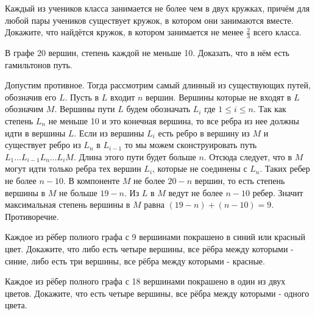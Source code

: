 \documentclass[11pt, a4paper]{common/document_template}
\begin{document}
\begin{exercise} 
Каждый из учеников класса занимается не более чем в двух кружках, причём для любой пары учеников существует кружок, в котором они занимаются вместе. Докажите, что найдётся кружок, в котором занимается не менее $\frac{2}{3}$ всего класса.
\end{exercise}

\begin{Solution}

\end{Solution}

\begin{exercise}
В графе 20 вершин, степень каждой не меньше 10. Доказать, что в нём есть гамильтонов путь.
\end{exercise}

\begin{Solution}
Допустим противное. Тогда рассмотрим самый длинный из существующих путей, обозначив его $L$. Пусть в $L$ входит $n$ вершин. Вершины которые не входят в $L$ обозначим $M$. Вершины пути $L$ будем обозначать $L_{i}$ где $1 \leqslant i \leqslant n$. Так как степень $L_{n}$ не меньше 10 и это конечная вершина, то все ребра из нее должны идти в вершины $L$. Если из вершины $L_{i}$ есть ребро в вершину из $M$ и существует ребро из $L_{n}$ в $L_{i - 1}$ то мы можем сконструировать путь $L_{1} \dots L_{i-1}L_{n}\dots L_{i} M$. Длина этого пути будет больше $n$. Отсюда следует, что в $M$ могут идти только ребра тех вершин $L_{i}$, которые не соединены с $L_{n}$. Таких ребер не более $n - 10$. В компоненте $M$ не более $20 - n$ вершин, то есть степень вершины в $M$ не больше $19 - n$. Из $L$ в $M$ ведут не более $n - 10$ ребер. Значит максимальная степень вершины в $M$ равна $(19 - n) + (n - 10) = 9$. Противоречие.
\end{Solution}

\begin{exercise}
Каждое из рёбер полного графа с 9 вершинами покрашено в синий или красный цвет. Докажите, что либо есть четыре вершины, все рёбра между которыми - синие, либо есть три вершины, все рёбра между которыми - красные.
\end{exercise}

\begin{Solution}
  
\end{Solution}

\begin{exercise}
Каждое из рёбер полного графа с 18 вершинами покрашено в один из двух цветов. Докажите, что есть четыре вершины, все рёбра между которыми - одного цвета.
\end{exercise}
\end{document}
